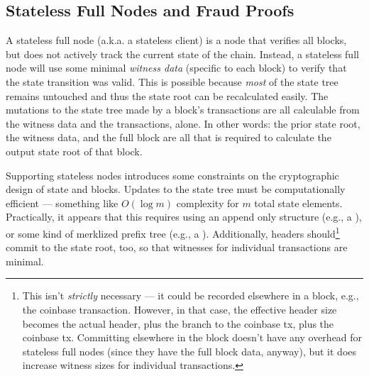 \subsection{Stateless Full Nodes and Fraud Proofs}

\label{sec:stateless-and-fraud-proofs}

A stateless full node (a.k.a. a stateless client) is a node that verifies all blocks, but does not actively track the current state of the chain.
Instead, a stateless full node will use some minimal \emph{witness data} (specific to each block) to verify that the state transition was valid.
This is possible because \emph{most} of the state tree remains untouched and thus the state root can be recalculated easily.
The mutations to the state tree made by a block's transactions are all calculable from the witness data and the transactions, alone.
In other words: the prior state root, the witness data, and the full block are all that is required to calculate the output state root of that block.


Supporting stateless nodes introduces some constraints on the cryptographic design of state and blocks.
Updates to the state tree must be computationally efficient --- something like $O(\log m)$ complexity for $m$ total state elements.
Practically, it appears that this requires using an append only structure (e.g., a \citeMMRLink{}), or some kind of merklized prefix tree (e.g., a \citeMerklixLink{}).
Additionally, headers should\footnote{
    This isn't \emph{strictly} necessary --- it could be recorded elsewhere in a block, e.g., the coinbase transaction.
    However, in that case, the effective header size becomes the actual header, plus the branch to the coinbase tx, plus the coinbase tx.
    Committing elsewhere in the block doesn't have any overhead for stateless full nodes (since they have the full block data, anyway), but it does increase witness sizes for individual transactions.
} commit to the state root, too, so that witnesses for individual transactions are minimal.

